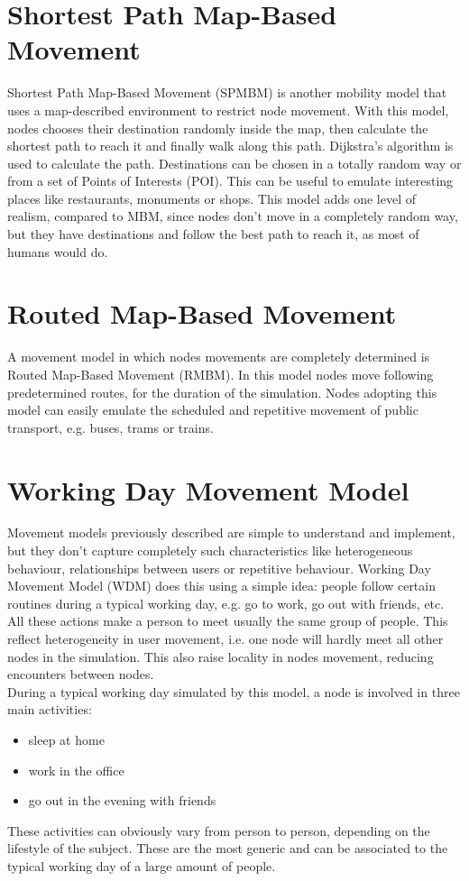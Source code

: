 \section{Shortest Path Map-Based Movement}
Shortest Path Map-Based Movement (SPMBM) is another mobility model that uses a map-described environment to restrict node movement. With this model, nodes chooses their destination randomly inside the map, then calculate the shortest path to reach it and finally walk along this path. Dijkstra's algorithm is used to calculate the path. Destinations can be chosen in a totally random way or from a set of Points of Interests (POI). This can be useful to emulate interesting places like restaurants, monuments or shops. This model adds one level of realism, compared to MBM, since nodes don't move in a completely random way, but they have destinations and follow the best path to reach it, as most of humans would do.


\section{Routed Map-Based Movement}
A movement model in which nodes movements are completely determined is Routed Map-Based Movement (RMBM). In this model nodes move following predetermined routes, for the duration of the simulation. Nodes adopting this model can easily emulate the scheduled and repetitive movement of public transport, e.g. buses, trams or trains.


\section{Working Day Movement Model}
\label{descrWDM}
Movement models previously described are simple to understand and implement, but they don't capture completely such characteristics like heterogeneous behaviour, relationships between users or repetitive behaviour. Working Day Movement Model (WDM) \cite{articoloWdm} does this using a simple idea: people follow certain routines during a typical working day, e.g. go to work, go out with friends, etc. All these actions make a person to meet usually the same group of people. This reflect heterogeneity in user movement, i.e. one node will hardly meet all other nodes in the simulation. This also raise locality in nodes movement, reducing encounters between nodes.
\\

During a typical working day simulated by this model, a node is involved in three main activities:
\begin{itemize}
\item sleep at home
\item work in the office
\item go out in the evening with friends
\end{itemize}
These activities can obviously vary from person to person, depending on the lifestyle of the subject. These are the most generic and can be associated to the typical working day of a large amount of people.
\\

